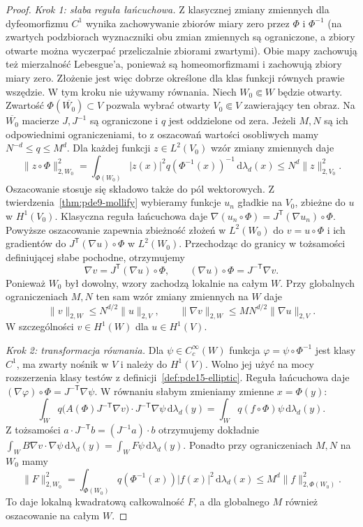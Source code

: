 \begin{proof}
\emph{Krok 1: słaba reguła łańcuchowa.}
Z klasycznej zmiany zmiennych dla dyfeomorfizmu $C^1$
wynika zachowywanie zbiorów miary zero przez $\Phi$
i $\Phi^{-1}$ (na zwartych podzbiorach wyznaczniki
obu zmian zmiennych są ograniczone, a zbiory otwarte
można wyczerpać przeliczalnie zbiorami zwartymi).
Obie mapy zachowują też mierzalność Lebesgue'a,
ponieważ są homeomorfizmami i zachowują zbiory miary zero.
Złożenie jest więc dobrze określone dla klas funkcji
równych prawie wszędzie. W tym kroku nie używamy równania. Niech $W_0\Subset W$
będzie otwarty. Zwartość $\Phi(\overline{W_0})\subset V$
pozwala wybrać otwarty $V_0\Subset V$ zawierający ten obraz.
Na $\overline{W_0}$ macierze $J,J^{-1}$ są ograniczone
i $q$ jest oddzielone od zera. Jeżeli $M,N$ są ich
odpowiednimi ograniczeniami, to z oszacowań wartości
osobliwych mamy $N^{-d}\le q\le M^d$.
Dla każdej funkcji $z\in L^2(V_0)$ wzór zmiany zmiennych daje
\[
 \|z\circ\Phi\|_{2,W_0}^2
 =\int_{\Phi(W_0)}|z(x)|^2
        q(\Phi^{-1}(x))^{-1}\,\mathrm d\lambda_d(x)
 \le N^d\|z\|_{2,V_0}^2.
\]
Oszacowanie stosuje się składowo także do pól wektorowych.
Z twierdzenia~\ref{thm:pde9-mollify} wybieramy funkcje
$u_n$ gładkie na $V_0$, zbieżne do $u$ w $H^1(V_0)$.
Klasyczna reguła łańcuchowa daje
$\nabla(u_n\circ\Phi)=J^{\mathsf T}(\nabla u_n)\circ\Phi$.
Powyższe oszacowanie zapewnia zbieżność złożeń w $L^2(W_0)$
do $v=u\circ\Phi$ i ich gradientów do
$J^{\mathsf T}(\nabla u)\circ\Phi$ w $L^2(W_0)$.
Przechodząc do granicy w tożsamości definiującej słabe
pochodne, otrzymujemy
\[
 \nabla v=J^{\mathsf T}(\nabla u)\circ\Phi,
 \qquad (\nabla u)\circ\Phi=J^{-\mathsf T}\nabla v.
\]
Ponieważ $W_0$ był dowolny, wzory zachodzą lokalnie
na całym $W$. Przy globalnych ograniczeniach $M,N$
ten sam wzór zmiany zmiennych na $W$ daje
\[
 \|v\|_{2,W}\le N^{d/2}\|u\|_{2,V},\qquad
 \|\nabla v\|_{2,W}\le MN^{d/2}\|\nabla u\|_{2,V}.
\]
W szczególności $v\in H^1(W)$ dla $u\in H^1(V)$.

\emph{Krok 2: transformacja równania.}
Dla $\psi\in C_c^\infty(W)$ funkcja
$\varphi=\psi\circ\Phi^{-1}$ jest klasy $C^1$,
ma zwarty nośnik w $V$ i należy do $H^1(V)$.
Wolno jej użyć na mocy rozszerzenia klasy testów
z definicji~\ref{def:pde15-elliptic}. Reguła łańcuchowa
daje $(\nabla\varphi)\circ\Phi=J^{-\mathsf T}\nabla\psi$.
W równaniu słabym zmieniamy zmienne $x=\Phi(y)$:
\[
 \int_W q\bigl(A(\Phi)J^{-\mathsf T}\nabla v\bigr)
      \cdot J^{-\mathsf T}\nabla\psi\,\mathrm d\lambda_d(y)
 =\int_W q(f\circ\Phi)\psi\,\mathrm d\lambda_d(y).
\]
Z tożsamości $a\cdot J^{-\mathsf T}b=(J^{-1}a)\cdot b$
otrzymujemy dokładnie $\int_W B\nabla v\cdot\nabla\psi
\,\mathrm d\lambda_d(y)=\int_W F\psi\,\mathrm d\lambda_d(y)$.
Ponadto przy ograniczeniach $M,N$ na $W_0$ mamy
\[
 \|F\|_{2,W_0}^2
 =\int_{\Phi(W_0)}q(\Phi^{-1}(x))|f(x)|^2\,\mathrm d\lambda_d(x)
 \le M^d\|f\|_{2,\Phi(W_0)}^2.
\]
To daje lokalną kwadratową całkowalność $F$, a dla
globalnego $M$ również oszacowanie na całym $W$.


\end{proof}
